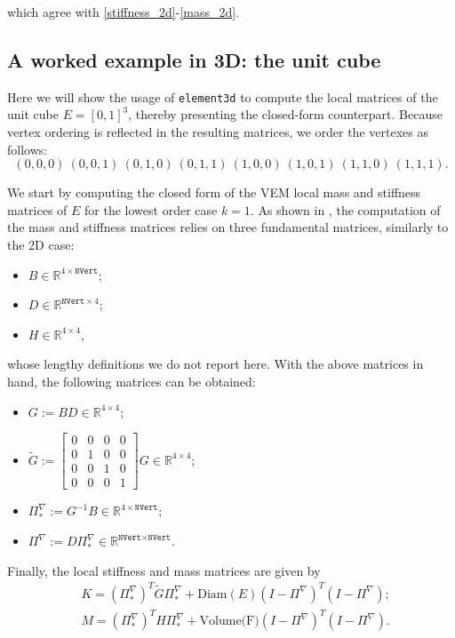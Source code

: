 \documentclass[a4paper]{article}
\begin{document}
\noindent
which agree with \eqref{stiffness_2d}-\eqref{mass_2d}.


\subsection{A worked example in 3D: the unit cube}
Here we will show the usage of \texttt{element3d} to compute the local matrices of the unit cube $E = [0,1]^3$, thereby presenting the closed-form counterpart.  Because vertex ordering is reflected in the resulting matrices, we order the vertexes as follows:
\begin{equation}
\label{cube_vertex_ordering}
(0, 0,0)\ 
(0,0, 1)\ 
(0,1, 0)\ 
(0, 1,1)\ 
(1 ,0,0)\ 
(1 ,0,1)\ 
(1 ,1,0)\ 
(1 ,1,1).
\end{equation}

\noindent
We start by computing the closed form of the VEM local mass and stiffness matrices of $E$ for the lowest order case $k=1$.  As shown in \cite{hitchhikers}, the computation of the mass and stiffness matrices relies on three fundamental matrices, similarly to the 2D case:
\begin{itemize}
\item $B \in \mathbb{R}^{4\times\texttt{NVert}}$;
\item $D \in \mathbb{R}^{\texttt{NVert} \times 4}$;
\item $H \in\mathbb{R}^{4\times 4}$,
\end{itemize}
whose lengthy definitions we do not report here. With the above matrices in hand, the following matrices can be obtained:
\begin{itemize}
\item $G := BD \in\mathbb{R}^{4\times 4}$;
\item $\widetilde{G} := \left[\begin{array}{cccc}
0 & 0 & 0 & 0\\ 0 & 1 & 0 & 0\\ 0 & 0 & 1 & 0\\ 0 & 0 & 0 & 1
\end{array}\right] G \in\mathbb{R}^{4\times 4}$;
\item $\Pi^\nabla_* := G^{-1}B \in \mathbb{R}^{4\times\texttt{NVert}}$;
\item $\Pi^\nabla := D\Pi^\nabla_* \in \mathbb{R}^{\texttt{NVert}\times\texttt{NVert}}$.
\end{itemize}

\noindent
Finally, the local stiffness and mass matrices are given by
\begin{align}
&K = (\Pi^\nabla_*)^T \widetilde{G} \Pi^\nabla_* + \text{Diam}(E)(I-\Pi^\nabla)^T(I-\Pi^\nabla);\\
&M = (\Pi^\nabla_*)^T H \Pi^\nabla_* + \text{Volume(F)}(I-\Pi^\nabla)^T(I-\Pi^\nabla).
\end{align}
\end{document}
